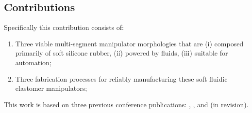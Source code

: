 \subsection{Contributions}
Specifically this contribution consists of:
\begin{enumerate}
  \item Three viable multi-segment manipulator morphologies that are (i) composed primarily of soft silicone rubber, (ii) powered by fluids, (iii) suitable for automation;
  \item Three fabrication processes for reliably manufacturing these soft fluidic elastomer manipulators;
\end{enumerate}
This work is based on three previous conference publications: \citep{marchese2014design}, \citep{marchese2014whole}, and \citep{katzschmann2015autonomous} (in revision). %